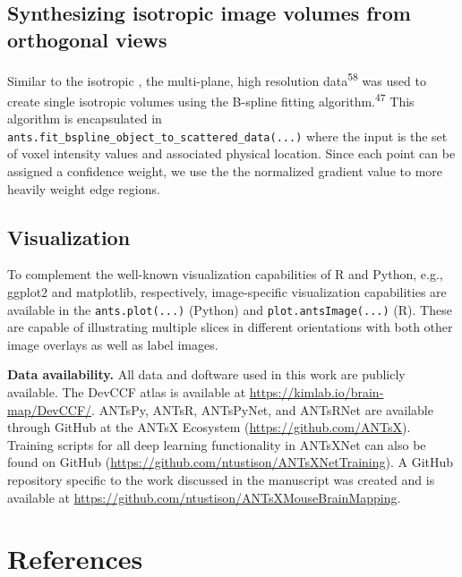 \documentclass[
  12pt,
]{article}
\begin{document}
\hypertarget{synthesizing-isotropic-image-volumes-from-orthogonal-views}{%
\subsection*{Synthesizing isotropic image volumes from orthogonal
views}\label{synthesizing-isotropic-image-volumes-from-orthogonal-views}}

Similar to the isotropic , the multi-plane, high resolution
data\textsuperscript{58} was used to create single isotropic volumes
using the B-spline fitting algorithm.\textsuperscript{47} This algorithm
is encapsulated in
\texttt{ants.fit\_bspline\_object\_to\_scattered\_data(...)} where the
input is the set of voxel intensity values and associated physical
location. Since each point can be assigned a confidence weight, we use
the the normalized gradient value to more heavily weight edge regions.

\hypertarget{visualization}{%
\subsection*{Visualization}\label{visualization}}

To complement the well-known visualization capabilities of R and Python,
e.g., ggplot2 and matplotlib, respectively, image-specific visualization
capabilities are available in the \texttt{ants.plot(...)} (Python) and
\texttt{plot.antsImage(...)} (R). These are capable of illustrating
multiple slices in different orientations with both other image overlays
as well as label images.

\clearpage
\newpage

\textbf{Data availability.} All data and doftware used in this work are
publicly available. The DevCCF atlas is available at
\url{https://kimlab.io/brain-map/DevCCF/}. ANTsPy, ANTsR, ANTsPyNet, and
ANTsRNet are available through GitHub at the ANTsX Ecosystem
(\url{https://github.com/ANTsX}). Training scripts for all deep learning
functionality in ANTsXNet can also be found on GitHub
(\url{https://github.com/ntustison/ANTsXNetTraining}). A GitHub
repository specific to the work discussed in the manuscript was created
and is available at
\url{https://github.com/ntustison/ANTsXMouseBrainMapping}.

\clearpage

\hypertarget{references}{%
\section*{References}\label{references}}
\end{document}
